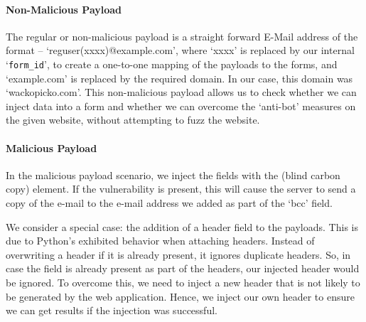 \paragraph{Non-Malicious Payload}
\label{Comp:Fuzzer:nmp}
The regular or non-malicious payload is a straight forward E-Mail address of the format -- `reguser(xxxx)@example.com', where `xxxx' is replaced by our internal `\lstinline{form_id}', to create a one-to-one mapping of the payloads to the forms, and `example.com' is replaced by the required domain. In our case, this domain was `wackopicko.com'.
This non-malicious payload allows us to check whether we can inject data into a form and whether we can overcome the `anti-bot' measures on the given website, without attempting to fuzz the website. 

\paragraph{Malicious Payload}
\label{Comp:Fuzzer:mp}
In the malicious payload scenario, we inject the fields with the  (blind carbon copy) element. If the vulnerability is present, this will cause the server to send a copy of the e-mail to the e-mail address we added as part of the `bcc' field.

We consider a special case: the addition of a  header field to the payloads. This is due to Python's exhibited behavior when attaching
headers. Instead of overwriting a header if it is already present, it ignores duplicate headers. So, in case the  field is already present as part of the headers, our injected  header would be ignored. To overcome this, we need to inject a new header that is not likely to be generated by the web application. Hence, we inject our own  header to ensure we can get results if the injection was successful.


